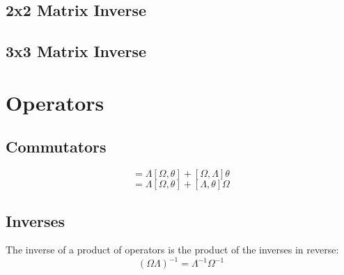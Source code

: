 \subsection{2x2 Matrix Inverse}
\subsection{3x3 Matrix Inverse}

\section{Operators}

\subsection{Commutators}
\begin{equation}
	[\Omega, \Lambda\theta] = \Lambda[\Omega, \theta] + [\Omega, \Lambda]\theta
\end{equation}
\begin{equation}
	[\Lambda\Omega, \theta] = \Lambda[\Omega, \theta] + [\Lambda, \theta]\Omega
\end{equation}

\subsection{Inverses}
The inverse of a product of operators is the product of the inverses in reverse:
\begin{equation}
	(\Omega\Lambda)^{-1} = \Lambda^{-1}\Omega^{-1}
\end{equation}



